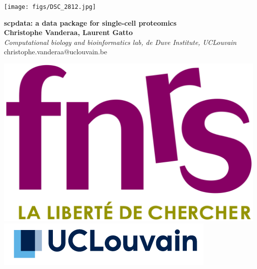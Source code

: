 \documentclass{article}
\title{}
\author{}
\date{}
\begin{document}


\begin{center}
\colorbox{lgray}{
  \begin{minipage}{3cm}
    \texttt{[image: figs/DSC\_2812.jpg]}
  \end{minipage}
  \begin{minipage}{.74\textwidth}
    \begin{center}
      \huge \textbf{scpdata: a data package for single-cell proteomics} \\
      \vspace{0.4cm}
      \Large \textbf{Christophe Vanderaa, Laurent Gatto} \\
      \Large \textit{Computational biology and bioinformatics lab, de Duve Institute, UCLouvain } \\
      \vspace{0.4cm}
      \normalsize christophe.vanderaa@uclouvain.be \\
    \end{center}
  \end{minipage}
  \begin{minipage}{3.7cm}
      \includegraphics[width=0.7\linewidth, right]{figs/fnrs.png} \\
      \vspace{0.5cm}
      \includegraphics[width=1.1\linewidth, right]{figs/ucl.png}
  \end{minipage}
}
\end{center}
\end{document}
